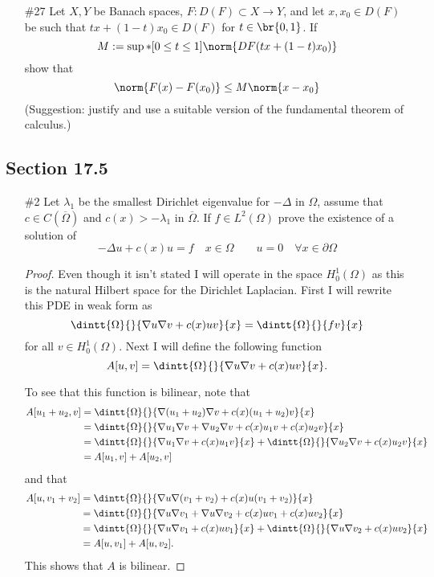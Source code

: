 \documentclass[11pt, oneside]{article}
\begin{document}
\begin{enumerate}
  \pagebreak
  \item[\#27]
    Let $X, Y$ be Banach spaces, $F: D(F) \subset X \to Y$, and let
    $x, x_0 \in D(F)$ be such that $tx + (1 - t)x_0 \in D(F)$ for
    $t \in \br{0, 1}$.
    If
    \[
      M := \sup*[0 \le t \le 1]{\norm{DF(tx + (1 - t)x_0)}}
    \]
    show that
    \[
      \norm{F(x) - F(x_0)} \le M\norm{x - x_0}
    \]
    (Suggestion: justify and use a suitable version of the fundamental theorem
    of calculus.)
\end{enumerate}

\pagebreak
\subsection*{Section 17.5}
\begin{enumerate}
  \item[\#2] %
    Let $\lambda_1$ be the smallest Dirichlet eigenvalue for $-\Delta$ in
    $\Omega$, assume that $c \in C(\overline{\Omega})$ and $c(x) > -\lambda_1$
    in $\overline{\Omega}$.
    If $f \in L^2(\Omega)$ prove the existence of a solution of
    \[
      -\Delta u + c(x) u = f \quad x \in \Omega \qquad u = 0 \quad \forall x \in \partial \Omega
    \]

    \begin{proof}
      Even though it isn't stated I will operate in the space $H^1_0(\Omega)$
      as this is the natural Hilbert space for the Dirichlet Laplacian.
      First I will rewrite this PDE in weak form as
      \[
        \dintt{\Omega}{}{\nabla u \nabla v + c(x) uv}{x} = \dintt{\Omega}{}{fv}{x}
      \]
      for all $v \in H^1_0(\Omega)$.
      Next I will define the following function
      \[
        A[u, v] = \dintt{\Omega}{}{\nabla u \nabla v + c(x) uv}{x}.
      \]

      To see that this function is bilinear, note that
      \begin{align*}
        A[u_1 + u_2, v] &= \dintt{\Omega}{}{\nabla (u_1 + u_2) \nabla v + c(x) (u_1 + u_2)v}{x} \\
        &= \dintt{\Omega}{}{\nabla u_1 \nabla v + \nabla u_2 \nabla v + c(x) u_1 v + c(x) u_2 v}{x} \\
        &= \dintt{\Omega}{}{\nabla u_1 \nabla v + c(x)u_1 v}{x} + \dintt{\Omega}{}{\nabla u_2 \nabla v + c(x) u_2 v}{x} \\
        &= A[u_1, v] + A[u_2, v]
      \end{align*}
      and that
      \begin{align*}
        A[u, v_1 + v_2] &= \dintt{\Omega}{}{\nabla u \nabla (v_1 + v_2) + c(x) u (v_1 + v_2)}{x} \\
        &= \dintt{\Omega}{}{\nabla u \nabla v_1 + \nabla u \nabla v_2 + c(x) u v_1 + c(x) u v_2}{x} \\
        &= \dintt{\Omega}{}{\nabla u \nabla v_1 + c(x) u v_1}{x} + \dintt{\Omega}{}{\nabla u \nabla v_2 + c(x) u v_2}{x} \\
        &= A[u, v_1] + A[u, v_2].
      \end{align*}
      This shows that $A$ is bilinear.


\end{proof}
\end{enumerate}
\end{document}
